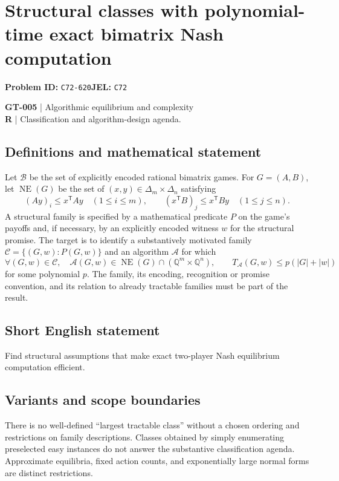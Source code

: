 \documentclass[11pt,a4paper]{article}
\begin{document}
\section*{Structural classes with polynomial-time exact bimatrix Nash computation}
\textbf{Problem ID:} \texttt{C72-620}\quad \textbf{JEL:} \texttt{C72}\par
\label{problem:OP-0135}
\label{game:GT-005}
{\sffamily\small\color{muted}
\textbf{GT-005} | Algorithmic equilibrium and complexity\\
\textbf{R} | Classification and algorithm-design agenda.
\par}
\subsection*{Definitions and mathematical statement}
Let $\mathcal B$ be the set of explicitly encoded rational bimatrix games. For $G=(A,B)$, let $\operatorname{NE}(G)$ be the set of $(x,y)\in\Delta_m\times\Delta_n$ satisfying
\[
 (Ay)_i\leq x^{\mathsf T}Ay\quad(1\leq i\leq m),\qquad
 (x^{\mathsf T}B)_j\leq x^{\mathsf T}By\quad(1\leq j\leq n).
\]
A structural family is specified by a mathematical predicate $P$ on the game's payoffs and, if necessary, by an explicitly encoded witness $w$ for the structural promise. The target is to identify a substantively motivated family $\mathcal C=\{(G,w):P(G,w)\}$ and an algorithm $\mathcal A$ for which
\[
 \forall(G,w)\in\mathcal C,\quad
 \mathcal A(G,w)\in\operatorname{NE}(G)\cap(\mathbb Q^m\times\mathbb Q^n),\qquad
 T_{\mathcal A}(G,w)\leq p(|G|+|w|)
\]
for some polynomial $p$. The family, its encoding, recognition or promise convention, and its relation to already tractable families must be part of the result.
\subsection*{Short English statement}
Find structural assumptions that make exact two-player Nash equilibrium computation efficient.
\subsection*{Variants and scope boundaries}
There is no well-defined ``largest tractable class'' without a chosen ordering and restrictions on family descriptions. Classes obtained by simply enumerating preselected easy instances do not answer the substantive classification agenda. Approximate equilibria, fixed action counts, and exponentially large normal forms are distinct restrictions.
\end{document}
